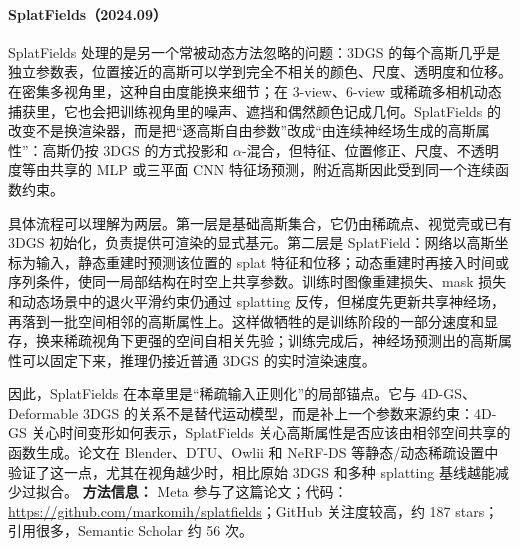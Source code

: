 \paragraph{SplatFields（2024.09）\cite{2409_11211}}
SplatFields 处理的是另一个常被动态方法忽略的问题：3DGS 的每个高斯几乎是独立参数表，位置接近的高斯可以学到完全不相关的颜色、尺度、透明度和位移。在密集多视角里，这种自由度能换来细节；在 3-view、6-view 或稀疏多相机动态捕获里，它也会把训练视角里的噪声、遮挡和偶然颜色记成几何。SplatFields 的改变不是换渲染器，而是把“逐高斯自由参数”改成“由连续神经场生成的高斯属性”：高斯仍按 3DGS 的方式投影和 $\alpha$-混合，但特征、位置修正、尺度、不透明度等由共享的 MLP 或三平面 CNN 特征场预测，附近高斯因此受到同一个连续函数约束。

具体流程可以理解为两层。第一层是基础高斯集合，它仍由稀疏点、视觉壳或已有 3DGS 初始化，负责提供可渲染的显式基元。第二层是 SplatField：网络以高斯坐标为输入，静态重建时预测该位置的 splat 特征和位移；动态重建时再接入时间或序列条件，使同一局部结构在时空上共享参数。训练时图像重建损失、mask 损失和动态场景中的退火平滑约束仍通过 splatting 反传，但梯度先更新共享神经场，再落到一批空间相邻的高斯属性上。这样做牺牲的是训练阶段的一部分速度和显存，换来稀疏视角下更强的空间自相关先验；训练完成后，神经场预测出的高斯属性可以固定下来，推理仍接近普通 3DGS 的实时渲染速度。

因此，SplatFields 在本章里是“稀疏输入正则化”的局部锚点。它与 4D-GS、Deformable 3DGS 的关系不是替代运动模型，而是补上一个参数来源约束：4D-GS 关心时间变形如何表示，SplatFields 关心高斯属性是否应该由相邻空间共享的函数生成。论文在 Blender、DTU、Owlii 和 NeRF-DS 等静态/动态稀疏设置中验证了这一点，尤其在视角越少时，相比原始 3DGS 和多种 splatting 基线越能减少过拟合。
\textbf{方法信息：} Meta 参与了这篇论文；代码：\url{https://github.com/markomih/splatfields}；GitHub 关注度较高，约 187 stars；引用很多，Semantic Scholar 约 56 次。



